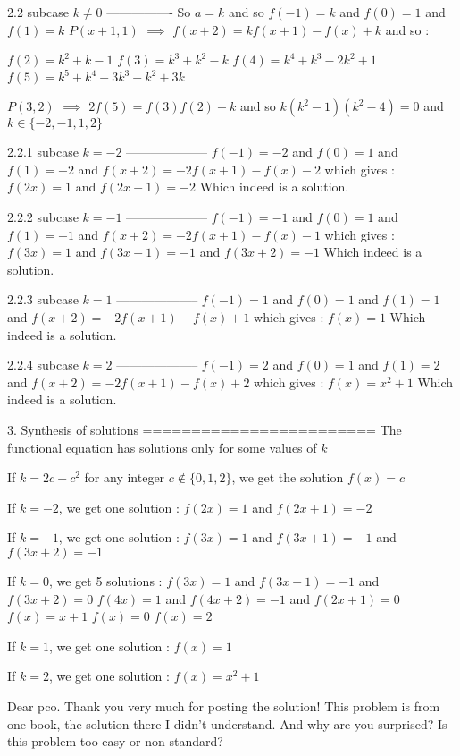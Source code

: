 \begin{solution}
2.2 subcase $k\ne 0$
----------------
So $a=k$ and so $f(-1)=k$ and $f(0)=1$ and $f(1)=k$
$P(x+1,1)$ $\implies$ $f(x+2)=kf(x+1)-f(x)+k$ and so :

$f(2)=k^2+k-1$
$f(3)=k^3+k^2-k$
$f(4)=k^4+k^3-2k^2+1$
$f(5)=k^5+k^4-3k^3-k^2+3k$

$P(3,2)$ $\implies$ $2f(5)=f(3)f(2)+k$ and so $k(k^2-1)(k^2-4)=0$ and $k\in\{-2,-1,1,2\}$

2.2.1 subcase $k=-2$
--------------------
$f(-1)=-2$ and $f(0)=1$ and $f(1)=-2$ and $f(x+2)=-2f(x+1)-f(x)-2$ which gives :
$f(2x)=1$ and $f(2x+1)=-2$
Which indeed is a solution.

2.2.2 subcase $k=-1$
--------------------
$f(-1)=-1$ and $f(0)=1$ and $f(1)=-1$ and $f(x+2)=-2f(x+1)-f(x)-1$ which gives :
$f(3x)=1$ and $f(3x+1)=-1$ and $f(3x+2)=-1$
Which indeed is a solution.

2.2.3 subcase $k=1$
--------------------
$f(-1)=1$ and $f(0)=1$ and $f(1)=1$ and $f(x+2)=-2f(x+1)-f(x)+1$ which gives :
$f(x)=1$
Which indeed is a solution.

2.2.4 subcase $k=2$
--------------------
$f(-1)=2$ and $f(0)=1$ and $f(1)=2$ and $f(x+2)=-2f(x+1)-f(x)+2$ which gives :
$f(x)=x^2+1$
Which indeed is a solution.

3. Synthesis of solutions
========================
The functional equation has solutions only for some values of $k$

If $k=2c-c^2$ for any integer $c\notin\{0,1,2\}$, we get the solution $f(x)=c$

If $k=-2$, we get one solution :
$f(2x)=1$ and $f(2x+1)=-2$

If $k=-1$, we get one solution :
$f(3x)=1$ and $f(3x+1)=-1$ and $f(3x+2)=-1$

If $k=0$, we get 5 solutions :
$f(3x)=1$ and $f(3x+1)=-1$ and $f(3x+2)=0$ 
$f(4x)=1$ and $f(4x+2)=-1$ and $f(2x+1)=0$ 
$f(x)=x+1$ 
$f(x)=0$
$f(x)=2$

If $k=1$, we get one solution :
$f(x)=1$

If $k=2$, we get one solution :
$f(x)=x^2+1$
\end{solution}



\begin{solution}
	Dear pco. Thank you very much for posting the solution! This problem is from one book, the solution there I didn't understand. And why are you surprised? Is this problem too easy or non-standard?
\end{solution}



